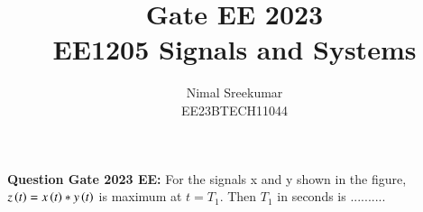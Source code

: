 \documentclass[a4,12pt,twocolumn]{IEEEtran}
\begin{document}
\let\vec\mathbf

\title{
\Huge\textbf{Gate EE 2023}\\
\Huge\textbf{EE1205} Signals and Systems\\
}
\large\author{Nimal Sreekumar\\EE23BTECH11044}

\maketitle



\bigskip

\renewcommand{\thefigure}{\arabic{figure}}
\renewcommand{\thetable}{\theenumi}


\textbf{Question Gate 2023 EE:}
For the signals x and y shown in the figure, $z\left(t\right)=x\left(t\right)*y\left(t\right)$ is maximum at $t=T_1$. Then $T_1$ in seconds is .......... \\
\end{document}
